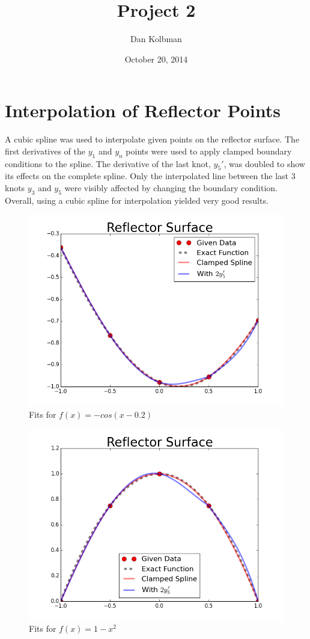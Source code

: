 \documentclass[12pt]{article}
\title{Project 2}
\author{Dan Kolbman}
\date{October 20, 2014}
\begin{document}
  
  \maketitle

  \section{Interpolation of Reflector Points}
  A cubic spline was used to interpolate given points on the reflector surface.
  The first derivatives of the $y_1$ and $y_n$ points were used to apply
  clamped boundary conditions to the spline.
  The derivative of the last knot, $y_5\prime$, was doubled to show its effects
  on the complete spline. Only the interpolated line between the last 3 knots
  $y_3$ and $y_5$ were visibly affected by changing the boundary condition.
  Overall, using a cubic spline for interpolation yielded very good results.

  \begin{figure}[h!]
    \centering
    \includegraphics[scale=0.9]{cos.png}
    \caption{Fits for $f(x)=-cos(x-0.2)$}
  \end{figure}

  \begin{figure}[h!]
    \centering
    \includegraphics[scale=0.75]{parabola.png}
    \caption{Fits for $f(x)=1-x^2$}
  \end{figure}
\end{document}

